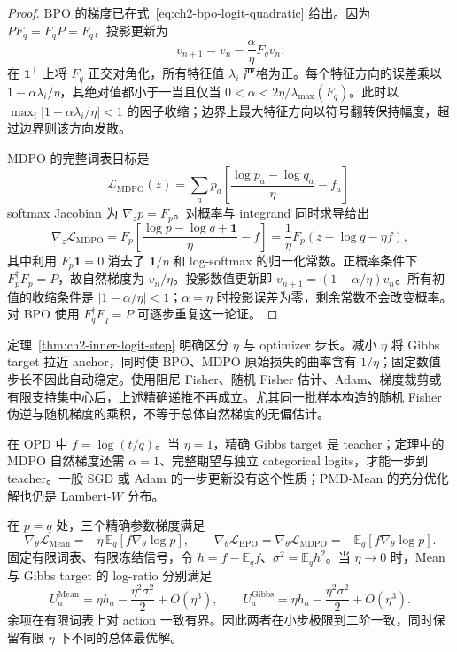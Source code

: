 \documentclass[lang=cn,scheme=chinese,openany]{../book/elegantbook}
\begin{document}
\begin{proof}
BPO 的梯度已在式~\eqref{eq:ch2-bpo-logit-quadratic} 给出。因为 $PF_q=F_qP=F_q$，投影更新为
\begin{equation*}
 v_{n+1}=v_n-\frac\alpha\eta F_qv_n.
\end{equation*}
在 $\mathbf1^\perp$ 上将 $F_q$ 正交对角化，所有特征值 $\lambda_i$ 严格为正。每个特征方向的误差乘以 $1-\alpha\lambda_i/\eta$，其绝对值都小于一当且仅当 $0<\alpha<2\eta/\lambda_{\max}(F_q)$。此时以 $\max_i|1-\alpha\lambda_i/\eta|<1$ 的因子收缩；边界上最大特征方向以符号翻转保持幅度，超过边界则该方向发散。

MDPO 的完整词表目标是
\begin{equation*}
 \mathcal L_{\mathrm{MDPO}}(z)
 =\sum_ap_a\left[\frac{\log p_a-\log q_a}{\eta}-f_a\right].
\end{equation*}
softmax Jacobian 为 $\nabla_z p=F_p$。对概率与 integrand 同时求导给出
\begin{equation*}
 \nabla_z\mathcal L_{\mathrm{MDPO}}
 =F_p\left[\frac{\log p-\log q+\mathbf1}{\eta}-f\right]
 =\frac1\eta F_p(z-\log q-\eta f),
\end{equation*}
其中利用 $F_p\mathbf1=0$ 消去了 $\mathbf1/\eta$ 和 log-softmax 的归一化常数。正概率条件下 $F_p^\dagger F_p=P$，故自然梯度为 $v_n/\eta$。投影数值更新即 $v_{n+1}=(1-\alpha/\eta)v_n$。所有初值的收缩条件是 $|1-\alpha/\eta|<1$；$\alpha=\eta$ 时投影误差为零，剩余常数不会改变概率。对 BPO 使用 $F_q^\dagger F_q=P$ 可逐步重复这一论证。
\end{proof}

定理~\ref{thm:ch2-inner-logit-step} 明确区分 $\eta$ 与 optimizer 步长。减小 $\eta$ 将 Gibbs target 拉近 anchor，同时使 BPO、MDPO 原始损失的曲率含有 $1/\eta$；固定数值步长不因此自动稳定。使用阻尼 Fisher、随机 Fisher 估计、Adam、梯度裁剪或有限支持集中心后，上述精确递推不再成立。尤其同一批样本构造的随机 Fisher 伪逆与随机梯度的乘积，不等于总体自然梯度的无偏估计。

在 OPD 中 $f=\log( t/q)$。当 $\eta=1$，精确 Gibbs target 是 teacher；定理中的 MDPO 自然梯度还需 $\alpha=1$、完整期望与独立 categorical logits，才能一步到 teacher。一般 SGD 或 Adam 的一步更新没有这个性质；PMD-Mean 的充分优化解也仍是 Lambert-$W$ 分布。

\begin{proposition}
\label{prop:ch2-eta-initial-scale}
在 $p=q$ 处，三个精确参数梯度满足
\begin{equation*}
 \nabla_\theta\mathcal L_{\mathrm{Mean}}
 =-\eta\,\mathbb E_q[f\nabla_\theta\log p],\qquad
 \nabla_\theta\mathcal L_{\mathrm{BPO}}
 =\nabla_\theta\mathcal L_{\mathrm{MDPO}}
 =-\mathbb E_q[f\nabla_\theta\log p].
\end{equation*}
固定有限词表、有限冻结信号，令 $h=f-\mathbb E_qf$、$\sigma^2=\mathbb E_qh^2$。当 $\eta\to0$ 时，Mean 与 Gibbs target 的 log-ratio 分别满足
\begin{equation*}
 U_a^{\mathrm{Mean}}=\eta h_a-\frac{\eta^2\sigma^2}{2}+O(\eta^3),\qquad
 U_a^{\mathrm{Gibbs}}=\eta h_a-\frac{\eta^2\sigma^2}{2}+O(\eta^3).
\end{equation*}
余项在有限词表上对 action 一致有界。因此两者在小步极限到二阶一致，同时保留有限 $\eta$ 下不同的总体最优解。
\end{proposition}
\end{document}
